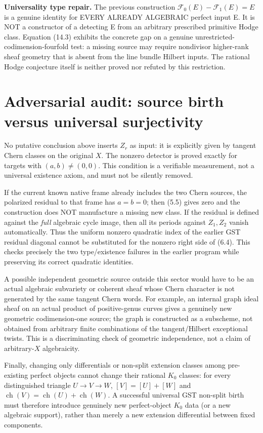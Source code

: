 \documentclass[11pt]{article}
\newcommand{\ch}{\operatorname{ch}}
\begin{document}
\noindent\textbf{Universality type repair.}
The previous construction
\(
 \mathcal F_0(E)-\mathcal F_1(E)=E
\)
is a genuine identity for
EVERY ALREADY ALGEBRAIC perfect
input E. It is NOT a constructor
of a detecting E from an arbitrary
prescribed primitive Hodge class.
Equation (14.3) exhibits the
concrete gap on a genuine
unrestricted-codimension-fourfold
test: a missing source may require
nondivisor higher-rank sheaf
geometry that is absent from the
line bundle Hilbert inputs.
The rational Hodge conjecture
itself is neither proved nor
refuted by this restriction.

\section{Adversarial audit: source birth versus universal surjectivity}
No putative conclusion above inserts \(Z_r\) as input: it is
explicitly given by tangent Chern classes on the original \(X\).
The nonzero detector is proved exactly for targets with
\((a,b)\ne(0,0)\). This condition is a verifiable measurement,
not a universal existence axiom, and must not be silently removed.

If the current known native frame already includes the two Chern
sources, the polarized residual to that frame has \(a=b=0\);
then (5.5) gives zero and the construction does NOT manufacture
a missing new class. If the residual is defined against the
\emph{full} algebraic cycle image, then all its periods against
\(Z_1,Z_2\) vanish automatically. Thus the uniform nonzero
quadratic index of the earlier GST residual diagonal cannot
be substituted for the nonzero right side of (6.4).
This checks precisely the two type/existence failures in the
earlier program while preserving its correct quadratic identities.

A possible independent geometric source outside this sector
would have to be an actual algebraic subvariety or coherent sheaf
whose Chern character is not generated by the same tangent
Chern words. For example, an internal graph ideal sheaf on an
actual product of positive-genus curves gives a genuinely new
geometric codimension-one source; the graph is constructed as
a subscheme, not obtained from arbitrary finite combinations
of the tangent/Hilbert exceptional twists. This is a
discriminating check of geometric independence, not a
claim of arbitrary-\(X\) algebraicity.

Finally, changing only differentials or non-split extension
classes among pre-existing perfect objects cannot change their
rational \(K_0\) classes:
for every distinguished triangle \(U\to V\to W\),
\([V]=[U]+[W]\) and \(\ch(V)=\ch(U)+\ch(W)\).
A successful universal GST non-split birth must therefore
introduce genuinely new perfect-object \(K_0\) data (or a new
algebraic support), rather than merely a new extension
differential between fixed components.
\end{document}
